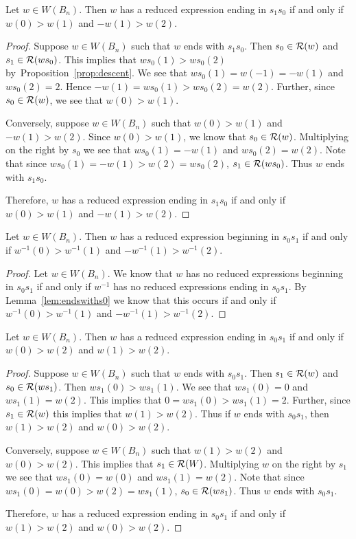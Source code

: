 \begin{lemma}\label{lem:endswiths0}
Let $w \in W(B_n)$. Then $w$ has a reduced expression ending in $s_1s_0$ if and only if $w(0)>w(1)$ and $-w(1)>w(2)$.
\begin{proof}
	Suppose $w \in W(B_n)$ such that $w$ ends with $s_1s_0$. Then $s_0 \in \mathcal{R}(w)$ and $s_1 \in \mathcal{R}(ws_0)$. This implies that $ws_0(1)>ws_0(2)$ by~Proposition~\ref{prop:descent}. We see that $ws_0(1)=w(-1)=-w(1)$ and $ws_0(2)=2$. Hence $-w(1)=ws_0(1)>ws_0(2)=w(2)$. Further, since $s_0 \in \mathcal{R}(w)$, we see that $w(0)>w(1)$.
	
	Conversely, suppose $w \in W(B_n)$ such that $w(0)>w(1)$ and $-w(1)>w(2)$. Since $w(0)>w(1)$, we know that $s_0 \in \mathcal{R}(w)$. Multiplying on the right by $s_0$ we see that $ws_0(1)=-w(1)$ and $ws_0(2)=w(2)$. Note that since $ws_0(1)=-w(1)>w(2)=ws_0(2)$, $s_1 \in \mathcal{R}(ws_0)$. Thus $w$ ends with $s_1s_0$. 
	
	Therefore, $w$ has a reduced expression ending in $s_1s_0$ if and only if $w(0)>w(1)$ and $-w(1)>w(2)$.
\end{proof}
\end{lemma}

\begin{corollary}\label{lem:beginswiths0}
	Let $w \in W(B_n)$. Then $w$ has a reduced expression beginning in $s_0s_1$ if and only if $w^{-1}(0)>w^{-1}(1)$ and $-w^{-1}(1)>w^{-1}(2)$.
	\begin{proof}
		Let $w \in W(B_n)$. We know that $w$ has no reduced expressions beginning in $s_0s_1$ if and only if $w^{-1}$ has no reduced expressions ending in $s_0s_1$. By Lemma~\ref{lem:endswiths0} we know that this occurs if and only if $w^{-1}(0)>w^{-1}(1)$ and $-w^{-1}(1)>w^{-1}(2)$.
	\end{proof}
\end{corollary}

\begin{lemma}\label{lem:endswiths_1}
Let $w \in W(B_n)$. Then $w$ has a reduced expression ending in $s_0s_1$ if and only if $w(0)>w(2)$ and $w(1)>w(2)$.
\begin{proof}
	Suppose $w \in W(B_n)$ such that $w$ ends with $s_0s_1$. Then $s_1 \in \mathcal{R}(w)$ and $s_0 \in \mathcal{R}(ws_1)$. Then $ws_1(0)>ws_1(1)$. We see that $ws_1(0)=0$ and $ws_1(1)=w(2)$. This implies that $0=ws_1(0)>ws_1(1)=2$. Further, since $s_1 \in \mathcal{R}(w)$ this implies that $w(1) > w(2)$. Thus if $w$ ends with $s_0s_1$, then $w(1)>w(2)$ and $w(0)>w(2)$.
	
	Conversely, suppose $w \in W(B_n)$ such that $w(1)>w(2)$ and $w(0)>w(2)$. This implies that $s_1 \in \mathcal{R}(W)$. Multiplying $w$ on the right by $s_1$ we see that $ws_1(0)=w(0)$ and $ws_1(1)=w(2)$. Note that since $ws_1(0)=w(0)>w(2)=ws_1(1)$, $s_0 \in \mathcal{R}(ws_1)$. Thus $w$ ends with $s_0s_1$. 
	
	Therefore, $w$ has a reduced expression ending in $s_0s_1$ if and only if $w(1)>w(2)$ and $w(0)>w(2)$.
\end{proof}	
\end{lemma}

